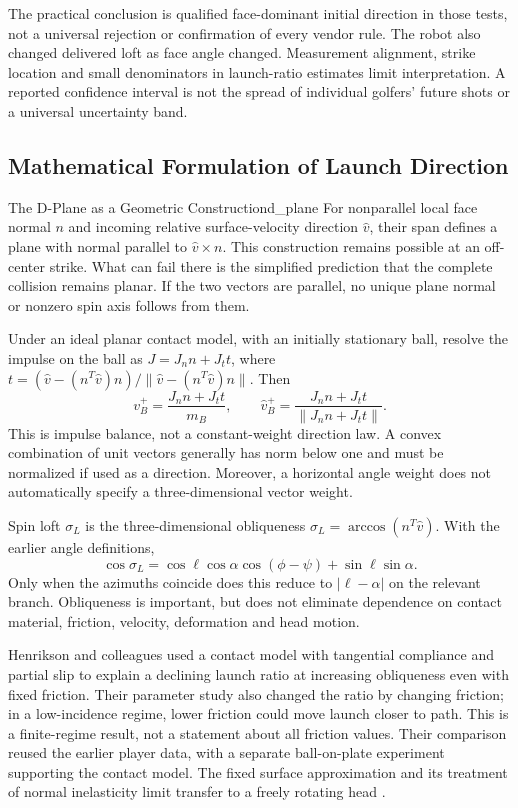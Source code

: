 The practical conclusion is qualified face-dominant initial direction in
those tests, not a universal rejection or confirmation of every vendor rule.
The robot also changed delivered loft as face angle changed. Measurement
alignment, strike location and small denominators in launch-ratio estimates
limit interpretation. A reported confidence interval is not the spread of
individual golfers' future shots or a universal uncertainty band.

\subsection{Mathematical Formulation of Launch Direction}

\begin{definition}{The D-Plane as a Geometric Construction}{d_plane}
For nonparallel local face normal $n$ and incoming relative surface-velocity
direction $\hat v$, their span defines a plane with normal parallel to
$\hat v\times n$. This construction remains possible at an off-center strike.
What can fail there is the simplified prediction that the complete collision
remains planar. If the two vectors are parallel, no unique plane normal or
nonzero spin axis follows from them.
\end{definition}

Under an ideal planar contact model, with an initially stationary ball,
resolve the impulse on the ball as $J=J_n n+J_t t$, where
$t=(\hat v-(n^T\hat v)n)/\|\hat v-(n^T\hat v)n\|$. Then
\begin{equation}
v_B^+=\frac{J_n n+J_t t}{m_B},\qquad
\hat v_B^+=\frac{J_n n+J_t t}{\|J_n n+J_t t\|}.
\label{eq:launch_weighted}
\end{equation}
This is impulse balance, not a constant-weight direction law. A convex
combination of unit vectors generally has norm below one and must be
normalized if used as a direction. Moreover, a horizontal angle weight does
not automatically specify a three-dimensional vector weight.

Spin loft $\sigma_L$ is the three-dimensional obliqueness
$\sigma_L=\arccos(n^T\hat v)$. With the earlier angle definitions,
\[
\cos\sigma_L=\cos\ell\cos\alpha\cos(\phi-\psi)+\sin\ell\sin\alpha.
\]
Only when the azimuths coincide does this reduce to $|\ell-\alpha|$ on the
relevant branch. Obliqueness is important, but does not eliminate dependence
on contact material, friction, velocity, deformation and head motion.

Henrikson and colleagues used a contact model with tangential compliance
and partial slip to explain a declining launch ratio at increasing obliqueness
even with fixed friction. Their parameter study also changed the ratio by
changing friction; in a low-incidence regime, lower friction could move launch
closer to path. This is a finite-regime result, not a statement about all
friction values. Their comparison reused the earlier player data, with a
separate ball-on-plate experiment supporting the contact model. The fixed
surface approximation and its treatment of normal inelasticity limit transfer
to a freely rotating head \citep{henrikson2020friction}.

